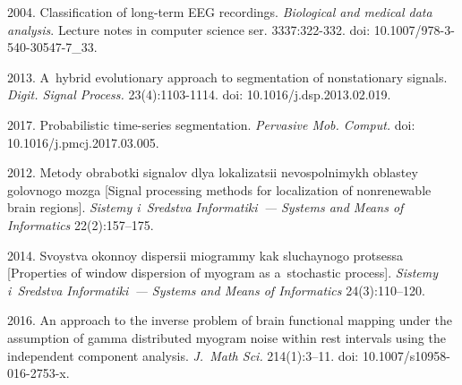   \begin{multicols}{2}

\renewcommand{\bibname}{\protect\rmfamily References}

{\small\frenchspacing
 {%
 \begin{thebibliography}{9}


 2004. 
Classification of long-term EEG recordings. 
\textit{ Biological
    and medical data analysis}.
{Lecture notes in computer science ser.} 3337:322-332. 
doi: 10.1007/978-3-540-30547-7\_33.

 2013. 
A~hybrid evolutionary approach to segmentation of nonstationary signals. 
\textit{Digit. Signal Process.} 23(4):1103-1114. doi: 10.1016/j.dsp.2013.02.019.

 2017. 
Probabilistic time-series segmentation. 
\textit{Pervasive Mob. Comput.} doi: 10.1016/j.pmcj.2017.03.005.

2012. Metody obrabotki signalov dlya lokalizatsii nevospolnimykh oblastey
 golovnogo mozga [Signal processing methods for localization of nonrenewable 
 brain regions]. \textit{Sistemy i~Sredstva Informatiki~--- 
 Systems and Means of Informatics} 22(2):157--175.

 2014. Svoystva okonnoy dispersii miogrammy kak
 sluchaynogo protsessa [Properties of window dispersion of myogram as 
 a~stochastic process]. \textit{Sistemy i~Sredstva Informatiki~---
 Systems and Means of Informatics} 24(3):110--120.

 2016. 
An approach to the inverse problem of brain functional mapping under the assumption of gamma distributed myogram noise within rest intervals using the independent component analysis. 
\textit{J.~Math Sci.} 214(1):3--11. doi: 10.1007/s10958-016-2753-x.
\end{thebibliography}

 }
 }

\end{multicols}


